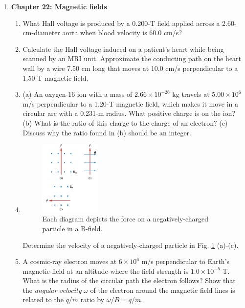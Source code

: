 \documentclass[10pt]{article}
\begin{document}
\begin{enumerate}
\begin{enumerate}
\end{enumerate}
\item \textbf{Chapter 22: Magnetic fields}
\begin{enumerate}
\item What Hall voltage is produced by a 0.200-T field applied across a 2.60-cm-diameter aorta when blood velocity is 60.0 cm/s? \\ \vspace{2cm}
\item Calculate the Hall voltage induced on a patient’s heart while being scanned by an MRI unit. Approximate the conducting path on the heart wall by a wire 7.50 cm long that moves at 10.0 cm/s perpendicular to a 1.50-T magnetic field. \\ \vspace{2cm}
\item (a) An oxygen-16 ion with a mass of $2.66\times 10^{−26}$ kg travels at $5.00 \times 10^{6}$ m/s perpendicular to a 1.20-T magnetic field, which makes it move in a circular arc with a 0.231-m radius. What positive charge is on the ion? (b) What is the ratio of this charge to the charge of an electron? (c) Discuss why the ratio found in (b) should be an integer. \\ \vspace{2cm}
\item 
\begin{figure}[ht]
\centering
\includegraphics[width=0.3\textwidth]{lorentz1.png}
\caption{\label{fig:lorentz1} Each diagram depicts the force on a negatively-charged particle in a B-field.}
\end{figure}
Determine the velocity of a negatively-charged particle in Fig. \ref{fig:lorentz1} (a)-(c). \\ \vspace{1cm}
\item A cosmic-ray electron moves at $6 \times 10^6$ m/s perpendicular to Earth’s magnetic field at an altitude where the field strength is $1.0 \times 10^{-5}$ T. What is the radius of the circular path the electron follows?  Show that the \textit{angular velocity} $\omega$ of the electron around the magnetic field lines is related to the $q/m$ ratio by $\omega/B = q/m$. \\ \vspace{1.5 cm}

\end{enumerate}
\end{enumerate}
\end{document}
